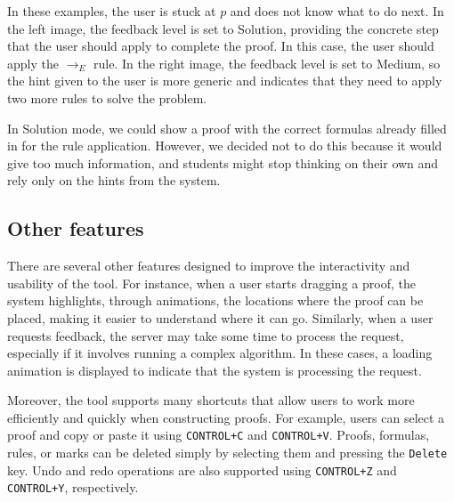 \vspace{1em}
In these examples, the user is stuck at \(p\) and does not know what to do next. In the left image, the feedback level is set to Solution, providing the concrete step that the user should apply to complete the proof. In this case, the user should apply the \(\to_E\) rule. In the right image, the feedback level is set to Medium, so the hint given to the user is more generic and indicates that they need to apply two more rules to solve the problem. 

In Solution mode, we could show a proof with the correct formulas already filled in for the rule application. However, we decided not to do this because it would give too much information, and students might stop thinking on their own and rely only on the hints from the system.

\begin{center}
\end{center}

\subsection{Other features}

There are several other features designed to improve the interactivity and usability of the tool. For instance, when a user starts dragging a proof, the system highlights, through animations, the locations where the proof can be placed, making it easier to understand where it can go. Similarly, when a user requests feedback, the server may take some time to process the request, especially if it involves running a complex algorithm. In these cases, a loading animation is displayed to indicate that the system is processing the request.

Moreover, the tool supports many shortcuts that allow users to work more efficiently and quickly when constructing proofs. For example, users can select a proof and copy or paste it using \texttt{CONTROL+C} and \texttt{CONTROL+V}. Proofs, formulas, rules, or marks can be deleted simply by selecting them and pressing the \texttt{Delete} key. Undo and redo operations are also supported using \texttt{CONTROL+Z} and \texttt{CONTROL+Y}, respectively.